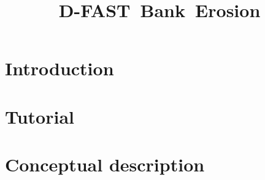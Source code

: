 \documentclass{deltares_manual}
\newcommand{\dfastbe}{\textrm{D-FAST~Bank~Erosion}\xspace}
\begin{document}
\pagestyle{empty}
\cleardoublepage
\title{\dfastbe}
\subtitle{}

\author{ }

\deltarestitle
%
\chapter{Introduction}
\chapter{Tutorial}
\chapter{Conceptual description}

%


%

\pagestyle{empty}
\cleardoublepage
\mbox{}
\end{document}
